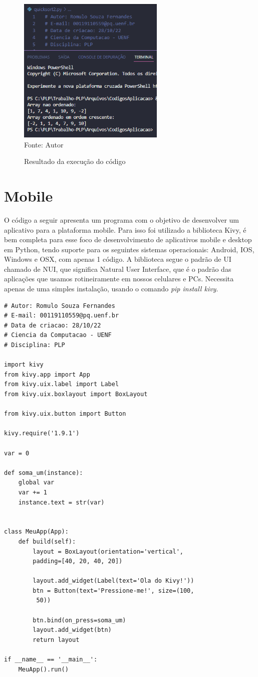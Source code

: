 	\begin{figure}[H]
		\begin{center}
			\caption{Resultado da execução do código} \label{ling1}
			\includegraphics[width=7cm]{quick.PNG} \\
			{\tiny \sf Fonte:{ Autor}}
		\end{center}
	\end{figure}


    \section{Mobile}
    O código a seguir apresenta um programa com o objetivo de desenvolver um aplicativo para a plataforma mobile. Para isso foi utilizado a biblioteca Kivy, é bem completa para esse foco de desenvolvimento de aplicativos mobile e desktop em Python, tendo suporte para os seguintes sistemas operacionais: Android, IOS, Windows e OSX, com apenas 1 código. A biblioteca segue o padrão de UI chamado de NUI, que significa Natural User Interface, que é o padrão das aplicações que usamos rotineiramente em nossos celulares e PCs. Necessita apenas de uma simples instalação, usando o comando \textit{pip install kivy}.

 
    
    
    \begin{lstlisting}
# Autor: Romulo Souza Fernandes
# E-mail: 00119110559@pq.uenf.br
# Data de criacao: 28/10/22
# Ciencia da Computacao - UENF
# Disciplina: PLP

import kivy
from kivy.app import App
from kivy.uix.label import Label
from kivy.uix.boxlayout import BoxLayout

from kivy.uix.button import Button

kivy.require('1.9.1')

var = 0

def soma_um(instance):
	global var
	var += 1
	instance.text = str(var)


class MeuApp(App):
	def build(self):
		layout = BoxLayout(orientation='vertical',
		padding=[40, 20, 40, 20])

		layout.add_widget(Label(text='Ola do Kivy!'))
		btn = Button(text='Pressione-me!', size=(100,
		 50))

		btn.bind(on_press=soma_um)
		layout.add_widget(btn)
		return layout

if __name__ == '__main__':
	MeuApp().run()
    \end{lstlisting}

